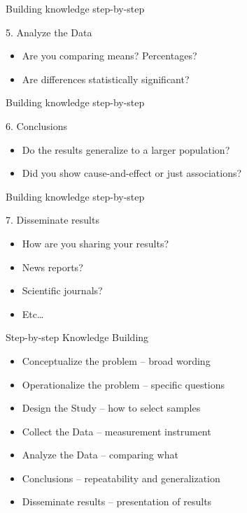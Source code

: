 \documentclass[14pt]{beamer}\usepackage[]{graphicx}\usepackage[]{color}
\begin{document}
\begin{frame}[fragile]{Building knowledge step-by-step}

5. Analyze the Data

\begin{itemize}
\item Are you comparing means? Percentages?
\item Are differences statistically significant?
\end{itemize}
\end{frame}

\begin{frame}[fragile]{Building knowledge step-by-step}

6. Conclusions

\begin{itemize}
\item Do the results generalize to a larger population?
\item Did you show cause-and-effect or just associations?
\end{itemize}
\end{frame}

\begin{frame}[fragile]{Building knowledge step-by-step}

7. Disseminate results

\begin{itemize}
\item How are you sharing your results?  
\item News reports? 
\item Scientific journals? 
\item Etc…
\end{itemize}
\end{frame}

\begin{frame}[fragile]{Step-by-step Knowledge Building }

\begin{itemize}
\item Conceptualize the problem -- broad wording
\item Operationalize the problem -- specific questions
\item Design the Study -- how to select samples
\item Collect the Data -- measurement instrument
\item Analyze the Data -- comparing what
\item Conclusions -- repeatability and generalization
\item Disseminate results -- presentation of results
\end{itemize}
\end{frame}
\end{document}

